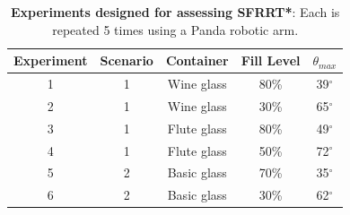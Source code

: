 \begin{table}[H]
\begin{center}
\begin{tabular}{||c | c | c | c | c||} 
 \hline
Experiment & Scenario & Container & Fill Level & $\theta_{max}$\\[0.5ex] 
 \hline
1 & 1 & Wine glass & 80\% & 39$^\circ$\\
\hline
2 & 1 & Wine glass & 30\% & 65$^\circ$\\
\hline
3 & 1 & Flute glass & 80\% & 49$^\circ$\\ 
\hline
4 & 1 & Flute glass & 50\% & 72$^\circ$\\ 
\hline
5 & 2 & Basic glass & 70\% & 35$^\circ$\\
\hline
6 & 2 & Basic glass & 30\% & 62$^\circ$\\
    \hline
\end{tabular}

\caption{\label{table:tasks} \textbf{Experiments designed for assessing SFRRT*}: Each is repeated 5 times using a Panda robotic arm.
}
\end{center}
\end{table}



